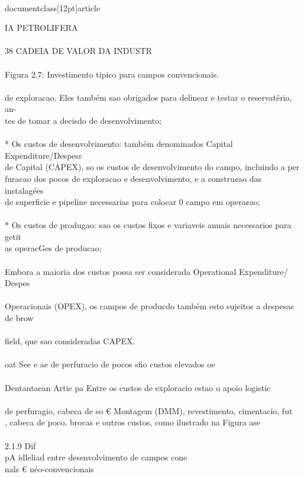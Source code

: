 \\documentclass[12pt]{article}
\begin{document}
IA PETROLIFERA\\
\\
38 CADEIA DE VALOR DA INDUSTR\\
\\
Figura 2.7: Investimento tipico para campos convencionais.\\
\\
de exploracao. Eles também sao obrigados para delinear e testar o reservatério, an-\\
tes de tomar a decisdo de desenvolvimento;\\
\\
* Os custos de desenvolvimento: também denominados Capital Expenditure/Despesr\\
de Capital (CAPEX), so os custos de desenvolvimento do campo, incluindo a per\\
furacao dos pocos de exploracao e desenvolvimento, e a constru¢ao das instalagées\\
de superficie e pipeline necessarias para colocar 0 campo em opera¢ao;\\
\\
* Os custos de produgao: sao os custos fixos e variaveis anuais necessarios para getit\\
as operacGes de producao;\\
\\
Embora a maioria dos custos possa ser considerada Operational Expenditure/ Despes\\
\\
Operacionais (OPEX), os campos de producdo também esto sujeitos a despesas de brow\\
\\
field, que sao consideradas CAPEX.\\
\\
oat See e ae de perfuracio de pocos sfio custos elevados oe\\
\\
Dentantaean Artie pa Entre os custos de exploracio estao o apoio logistic\\
\\
de perfuragio, cabeca de so € Montagem (DMM), revestimento, cimentacio, fut\\
, cabeca de poco, brocas e outros custos, como ilustrado na Figura ase\\
\\
2.1.9 Dif\\
pA idleliad entre desenvolvimento de campos cone\\
nals € néo-convencionais\\
\end{document}
